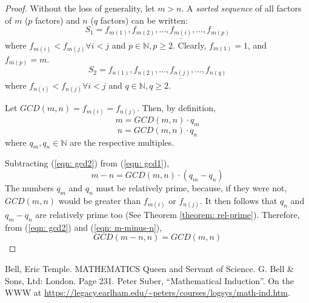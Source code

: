 \documentclass[a4paper]{article}
\begin{document}
\begin{proof}
    Without the loss of generality, let $m > n$. A \emph{sorted sequence} of all factors of $m$ ($p$ factors) and $n$ ($q$ factors) can be written:
\begin{equation}
\label{eqn: s1}
    S_1 = f_{m(1)}, f_{m(2)}, \dots, \underline{f_{m(i)}}, \dots, f_{m(p)} 
\end{equation}
    where $f_{m(i)} < f_{m(j)} \forall i < j$ and $p \in \mathbb{N}, p \ge 2$. Clearly, $f_{m(1)} = 1$, and $f_{m(p)} = m$.
\begin{equation}
\label{eqn: s2}
    S_2 = f_{n(1)}, f_{n(2)}, \dots, \underline{f_{n(j)}}, \dots, f_{n(q)}
\end{equation}
    where $f_{n(i)} < f_{n(j)} \forall i < j$ and $q \in \mathbb{N}, q \ge 2$.

Let $GCD(m, n) = f_{m(i)} = f_{n(j)}$. Then, by definition, 
\begin{equation}
\label{eqn: gcd1}
    m = GCD(m, n) \cdot q_{m}
\end{equation}
\begin{equation}
\label{eqn: gcd2}
    n = GCD(m, n) \cdot q_{n}
\end{equation}
where $q_{m}, q_{n} \in \mathbb{N}$ are the respective multiples.

    Subtracting  (\ref{eqn: gcd2}) from (\ref{eqn: gcd1}), 
\begin{equation}
\label{eqn: m-minus-n}
    m - n = GCD(m, n) \cdot (q_{m} - q_{n})
\end{equation}
    The numbers $q_{m}$ and $q_{n}$ must be relatively prime, because, if they were not, $GCD(m, n)$ would be greater than $f_{m(i)}$ or $f_{n(j)}$. It then follows that $q_{n}$ and $q_{m}-q_{n}$ are relatively prime too (See Theorem \ref{theorem: rel-prime}). Therefore, from (\ref{eqn: gcd2}) and (\ref{eqn: m-minus-n}), 
$$
GCD(m-n, n) = GCD(m, n)
$$
\end{proof}
\begin{thebibliography}{00}
     Bell, Eric Temple. MATHEMATICS Queen and Servant of Science. G. Bell \& Sons, Ltd: London. Page 231.
     Peter Suber, ``Mathematical Induction''. On the WWW at \url{https://legacy.earlham.edu/~peters/courses/logsys/math-ind.htm}.
\end{thebibliography}
\end{document}
